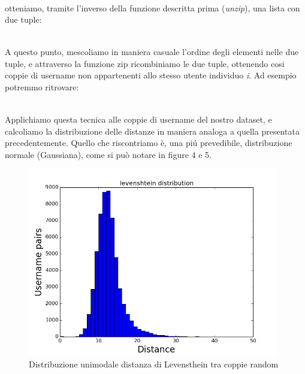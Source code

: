 \begin{gather*}
  [(i\textsubscript{1}u\textsubscript{1},i\textsubscript{1}u\textsubscript{2}), (i\textsubscript{2}u\textsubscript{1},i\textsubscript{2}u\textsubscript{2}), (i\textsubscript{3}u\textsubscript{1},i\textsubscript{3}u\textsubscript{2})]
\end{gather*}

otteniamo, tramite l'inverso della funzione descritta prima (\textit{unzip}), una lista con due tuple:

\begin{gather*}
  [(i\textsubscript{1}u\textsubscript{1},i\textsubscript{2}u\textsubscript{1}, i\textsubscript{3}u\textsubscript{1}),(i\textsubscript{1}u\textsubscript{2}, i\textsubscript{2}u\textsubscript{2},i\textsubscript{3}u\textsubscript{2})]
\end{gather*}

A questo punto, mescoliamo in maniera casuale l'ordine degli elementi nelle due tuple, e attraverso la funzione zip ricombiniamo le due tuple, ottenendo cosi coppie di username non appartenenti allo stesso utente individuo \textit{i}. Ad esempio potremmo ritrovare:

\begin{gather*}
  [(i\textsubscript{1}u\textsubscript{1},i\textsubscript{2}u\textsubscript{2}), (i\textsubscript{2}u\textsubscript{1},i\textsubscript{3}u\textsubscript{2}), (i\textsubscript{3}u\textsubscript{1},i\textsubscript{1}u\textsubscript{2})]
\end{gather*}


Applichiamo questa tecnica alle coppie di username del nostro dataset, e calcoliamo la distribuzione delle distanze in maniera analoga a quella presentata precedentemente. Quello che riscontriamo è, una piú prevedibile, distribuzione normale (Gaussiana), come si può notare in figure 4 e 5.

\begin{figure}[bp!]
\centering
\includegraphics[width=110mm]{chapters/distanceplot/random_levenshtein_distribution.png}
\caption{Distribuzione unimodale distanza di Levensthein tra coppie random  \label{overflow}}
\end{figure}

